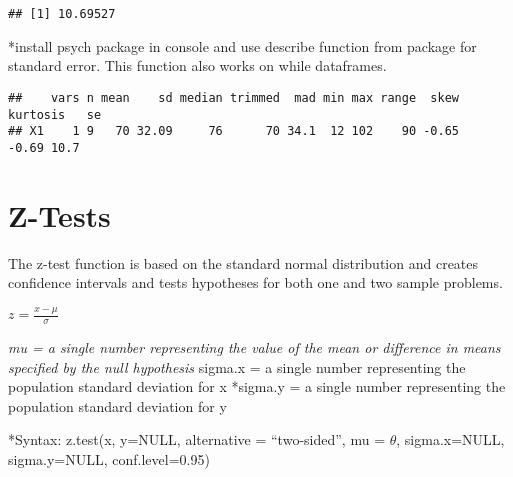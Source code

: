 \documentclass[]{article}
\newenvironment{Shaded}{\begin{snugshade}}{\end{snugshade}}
\newcommand{\DataTypeTok}[1]{\textcolor[rgb]{0.13,0.29,0.53}{#1}}
\newcommand{\DecValTok}[1]{\textcolor[rgb]{0.00,0.00,0.81}{#1}}
\newcommand{\KeywordTok}[1]{\textcolor[rgb]{0.13,0.29,0.53}{\textbf{#1}}}
\newcommand{\NormalTok}[1]{#1}
\newcommand{\OperatorTok}[1]{\textcolor[rgb]{0.81,0.36,0.00}{\textbf{#1}}}
\newcommand{\OtherTok}[1]{\textcolor[rgb]{0.56,0.35,0.01}{#1}}
\newcommand{\StringTok}[1]{\textcolor[rgb]{0.31,0.60,0.02}{#1}}
\begin{document}
\begin{Shaded}
\end{Shaded}

\begin{verbatim}
## [1] 10.69527
\end{verbatim}

*install psych package in console and use describe function from package
for standard error. This function also works on while dataframes.

\begin{Shaded}
\end{Shaded}

\begin{verbatim}
##    vars n mean    sd median trimmed  mad min max range  skew kurtosis   se
## X1    1 9   70 32.09     76      70 34.1  12 102    90 -0.65    -0.69 10.7
\end{verbatim}

\hypertarget{z-tests}{%
\section{Z-Tests}\label{z-tests}}

The z-test function is based on the standard normal distribution and
creates confidence intervals and tests hypotheses for both one and two
sample problems.

\(z = \frac{x-\mu}{\sigma}\)

\emph{mu = a single number representing the value of the mean or
difference in means specified by the null hypothesis }sigma.x = a single
number representing the population standard deviation for x *sigma.y = a
single number representing the population standard deviation for y

*Syntax: z.test(x, y=NULL, alternative = ``two-sided'', mu = \(\theta\),
sigma.x=NULL, sigma.y=NULL, conf.level=0.95)
\end{document}
